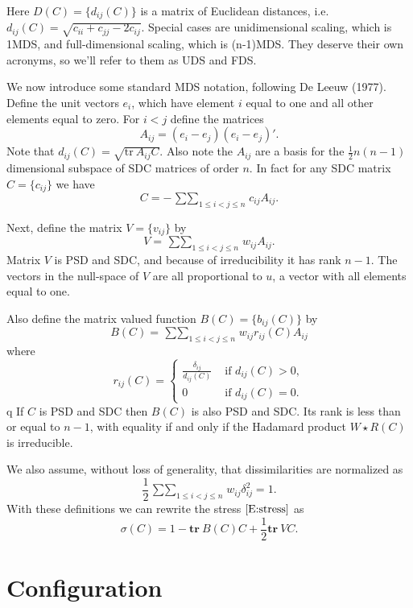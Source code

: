 \documentclass[
  12pt,
]{article}
\begin{document}
Here \(D(C)=\{d_{ij}(C)\}\) is a matrix of Euclidean distances, i.e.
\(d_{ij}(C)=\sqrt{c_{ii}+c_{jj}-2c_{ij}}\). Special cases are
unidimensional scaling, which is 1MDS, and full-dimensional scaling,
which is (n-1)MDS. They deserve their own acronyms, so we'll refer to
them as UDS and FDS.

We now introduce some standard MDS notation, following De Leeuw (1977).
Define the unit vectors \(e_i\), which have element \(i\) equal to one
and all other elements equal to zero. For \(i<j\) define the matrices
\[A_{ij}=(e_i-e_j)(e_i-e_j)'.\] Note that
\(d_{ij}(C)=\sqrt{\text{tr}\ A_{ij}C}\). Also note the \(A_{ij}\) are a
basis for the \(\frac12 n(n-1)\) dimensional subspace of SDC matrices of
order \(n\). In fact for any SDC matrix \(C=\{c_{ij}\}\) we have \[
C=-\mathop{\sum\sum}_{1\leq i<j\leq n}c_{ij}A_{ij}.
\]

Next, define the matrix \(V=\{v_{ij}\}\) by \begin{equation}\label{E:V}
V=\mathop{\sum\sum}_{1\leq i<j\leq n}w_{ij}A_{ij}.
\end{equation} Matrix \(V\) is PSD and SDC, and because of
irreducibility it has rank \(n-1\). The vectors in the null-space of
\(V\) are all proportional to \(u\), a vector with all elements equal to
one.

Also define the matrix valued function \(B(C)=\{b_{ij}(C)\}\) by
\begin{equation}\label{E:B}
B(C)=\mathop{\sum\sum}_{1\leq i<j\leq n}w_{ij}r_{ij}(C)A_{ij}
\end{equation} where \[
r_{ij}(C)=\begin{cases}\frac{\delta_{ij}}{d_{ij}(C)}&\text{ if }d_{ij}(C)>0,\\
0&\text{ if }d_{ij}(C)=0.
\end{cases}
\]q If \(C\) is PSD and SDC then \(B(C)\) is also PSD and SDC. Its rank
is less than or equal to \(n-1\), with equality if and only if the
Hadamard product \(W\star R(C)\) is irreducible.

We also assume, without loss of generality, that dissimilarities are
normalized as \[
\frac12\mathop{\sum\sum}_{1\leq i<j\leq n}w_{ij}\delta_{ij}^2=1.
\] With these definitions we can rewrite the stress \(\eqref{E:stress}\)
as \begin{equation}\label{E:mstress}
\sigma(C)=1-\mathbf{tr}\ B(C)C+\frac12\mathbf{tr}\ VC.
\end{equation}

\section{Configuration}\label{configuration}
\end{document}
